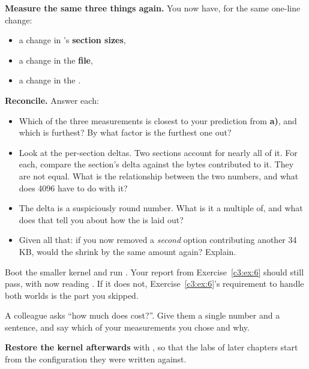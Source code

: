  \textbf{Measure the same three things again.} You now have, for the same one-line change:
\begin{itemize}
  \item a change in 's \textbf{section sizes},
  \item a change in the \textbf{ file},
  \item a change in the \textbf{}.
\end{itemize}

 \textbf{Reconcile.} Answer each:
\begin{itemize}
  \item Which of the three measurements is closest to your prediction from \textbf{a)}, and which is
    furthest? By what factor is the furthest one out?
  \item Look at the per-section deltas. Two sections account for nearly all of it. For each, compare
    the section's delta against the bytes  contributed to it. They are not equal.
    What is the relationship between the two numbers, and what does 4096 have to do with it?
  \item The  delta is a suspiciously round number. What is it a multiple of, and what
    does that tell you about how the  is laid out?
  \item Given all that: if you now removed a \emph{second} option contributing another 34 KB, would
    the  shrink by the same amount again? Explain.
\end{itemize}

 Boot the smaller kernel and run . Your report from
Exercise~\ref{c3:ex:6} should still pass, with  now reading . If
it does not, Exercise~\ref{c3:ex:6}'s requirement to handle both worlds is the part you skipped.

 A colleague asks ``how much does  cost?''. Give them a single number
and a sentence, and say which of your measurements you chose and why.

\textbf{Restore the kernel afterwards} with , so that
the labs of later chapters start from the configuration they were written against.
